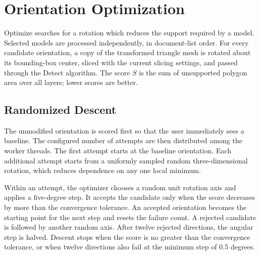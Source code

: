 
\chapter{Orientation Optimization}
\label{chap:optimize}

Optimize searches for a rotation which reduces the support required by a
model. Selected models are processed independently, in document-list order.
For every candidate orientation, a copy of the transformed triangle mesh is
rotated about its bounding-box center, sliced with the current slicing
settings, and passed through the Detect algorithm. The score $S$ is the sum
of unsupported polygon area over all layers; lower scores are better.

\section{Randomized Descent}

The unmodified orientation is scored first so that the user immediately sees
a baseline. The configured number of attempts are then distributed among the
worker threads. The first attempt starts at the baseline orientation. Each
additional attempt starts from a uniformly sampled random three-dimensional
rotation, which reduces dependence on any one local minimum.

Within an attempt, the optimizer chooses a random unit rotation axis and
applies a five-degree step. It accepts the candidate only when the score
decreases by more than the convergence tolerance. An accepted orientation
becomes the starting point for the next step and resets the failure count. A
rejected candidate is followed by another random axis. After twelve rejected
directions, the angular step is halved. Descent stops when the score is no
greater than the convergence tolerance, or when twelve directions also fail
at the minimum step of 0.5 degrees.

